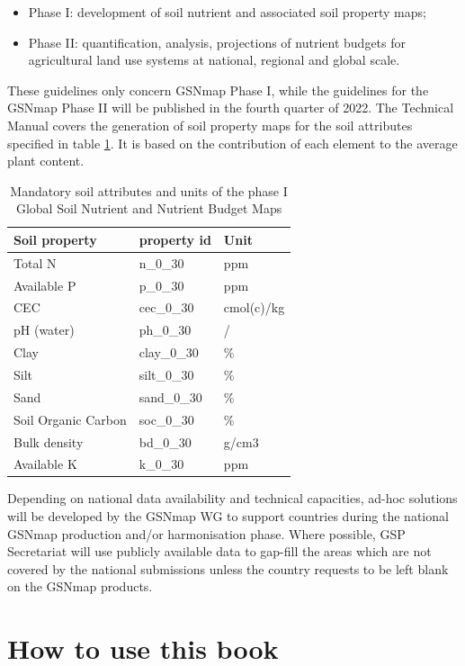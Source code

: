 \documentclass[
  10pt,
  b5paper,
  oneside]{book}
\providecommand{\tightlist}{%
  \setlength{\itemsep}{0pt}\setlength{\parskip}{0pt}}
\begin{document}
\begin{itemize}
\tightlist
\item
  Phase I: development of soil nutrient and associated soil property maps;
\item
  Phase II: quantification, analysis, projections of nutrient budgets for agricultural land use systems at national, regional and global scale.
\end{itemize}

These guidelines only concern GSNmap Phase I, while the guidelines for the GSNmap Phase II will be published in the fourth quarter of 2022. The Technical Manual covers the generation of soil property maps for the soil attributes specified in table \ref{tab:overviewprop}. It is based on the contribution of each element to the average plant content.

\begin{table}

\caption{\label{tab:overviewprop}Mandatory soil attributes and units of the phase I Global Soil Nutrient and Nutrient Budget Maps}
\centering
\begin{tabular}[t]{lll}
\toprule
Soil property & property id & Unit\\
\midrule
Total N & n\_0\_30 & ppm\\
Available P & p\_0\_30 & ppm\\
CEC & cec\_0\_30 & cmol(c)/kg\\
pH (water) & ph\_0\_30 & /\\
Clay & clay\_0\_30 & \%\\
\addlinespace
Silt & silt\_0\_30 & \%\\
Sand & sand\_0\_30 & \%\\
Soil Organic Carbon & soc\_0\_30 & \%\\
Bulk density & bd\_0\_30 & g/cm3\\
Available K & k\_0\_30 & ppm\\
\bottomrule
\end{tabular}
\end{table}

Depending on national data availability and technical capacities, ad-hoc solutions will be developed by the GSNmap WG to support countries during the national GSNmap production and/or harmonisation phase. Where possible, GSP Secretariat will use publicly available data to gap-fill the areas which are not covered by the national submissions unless the country requests to be left blank on the GSNmap products.

\hypertarget{how-to-use-this-book}{%
\section{How to use this book}\label{how-to-use-this-book}}
\end{document}
